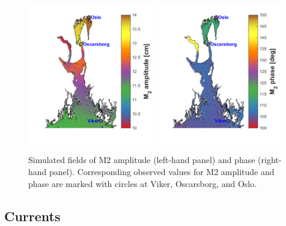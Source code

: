 \begin{figure}[hb] 
\centerline{ 
\includegraphics*[trim=1cm 0cm 0cm 0cm,clip=true,width=0.49\textwidth]{Figurer/M2amp_felt}  
\includegraphics*[trim=0.8cm 0cm 0cm 0cm,clip=true,width=0.49\textwidth]{Figurer/M2fase_felt} 
} 
\caption{\small 
Simulated fields of M2 amplitude (left-hand panel) and phase (right-hand panel). Corresponding observed values for M2 amplitude and phase are marked with circles at Viker, Oscarsborg, and Oslo.} 
\label{fig:M2field} 
\end{figure} 



\clearpage 
\subsection{Currents}
\label{subsec:curree}



